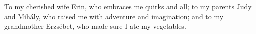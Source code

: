 
To my cherished wife Erin, who embraces me quirks and all; to my parents Judy
and Mih{\'a}ly, who raised me with adventure and imagination; and to my
grandmother Erzs{\'e}bet, who made sure I ate my vegetables.
